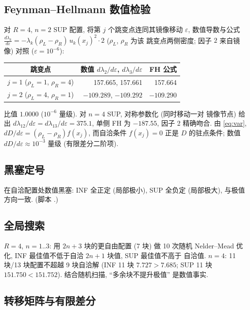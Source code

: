 \documentclass[UTF8]{ctexart}
\begin{document}
\subsection{Feynman--Hellmann 数值检验}

对 $R=4$, $n=2$ SUP 配置, 将第 $j$ 个跳变点连同其镜像移动 $\varepsilon$,
数值导数与公式 $\frac{d\lambda_k}{d\varepsilon} =
-\lambda_k(\rho_L - \rho_R)\,u_k(x_j)^2\cdot 2$ ($\rho_L$, $\rho_R$ 为该
跳变点两侧密度; 因子 $2$ 来自镜像) 对照 ($\varepsilon = 10^{-6}$):
\begin{center}
\begin{tabular}{c|rr}
	跳变点 & 数值 $d\lambda_2/d\varepsilon$, $d\lambda_3/d\varepsilon$ & FH 公式 \\\hline
	$j = 1$ ($\rho_L = 1$, $\rho_R = 4$) & 157.665, 157.661 & 157.664\\
	$j = 2$ ($\rho_L = 4$, $\rho_R = 1$) & $-109.289$, $-109.292$ & $-109.290$\\
\end{tabular}
\end{center}
比值 $1.0000$ ($10^{-6}$ 量级). 对 $n=4$ SUP, 对称参数化 (同时移动一对
镜像节点) 给出 $d\lambda_{12}/d\varepsilon = d\lambda_{13}/d\varepsilon =
375.1$, 单侧 FH 为 $-187.55$, 因子 2 精确吻合. 由 \eqref{eq:var},
$dD/d\varepsilon = (\rho_L - \rho_R)f(x_j)$, 而自洽条件 $f(x_j) = 0$
正是 $D$ 的驻点条件; 数值 $dD/d\varepsilon \approx 10^{-3}$ 量级
(有限差分二阶项).

\subsection{黑塞定号}

在自洽配置处数值黑塞: INF 全正定 (局部极小), SUP 全负定 (局部极大),
与极值方向一致. (脚本 .)

\subsection{全局搜索}

$R=4$, $n=1..3$: 用 $2n+3$ 块的更自由配置 (7 块) 做 10 次随机
Nelder--Mead 优化, INF 最佳值不低于自洽 $2n+1$ 块值, SUP 最佳值不高于
自洽值. $n=4$: 11 块/13 块配置不超越 9 块自洽解 (INF 11 块
$7.727 > 7.685$; SUP 11 块 $151.750 < 151.752$). 结合随机扫描,
``多余块不提升极值'' 是数值事实.

\subsection{转移矩阵与有限差分}
\end{document}
